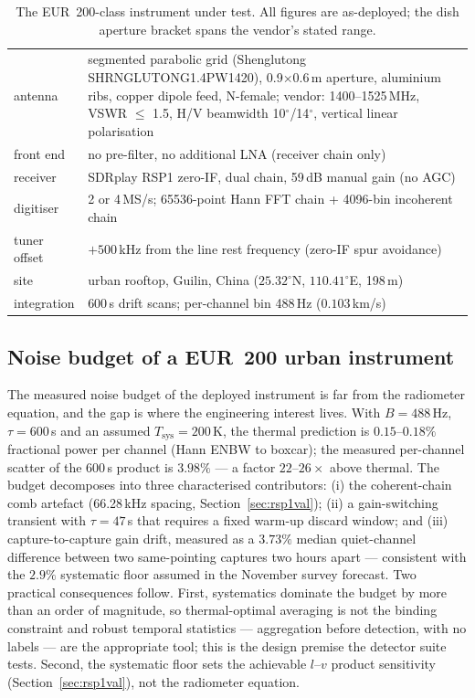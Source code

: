 \documentclass[journal]{IEEEtran}
\begin{document}
\begin{table}[!t]
\centering
\caption{The EUR~200-class instrument under test.  All figures are
as-deployed; the dish aperture bracket spans the vendor's stated range.}
\label{tab:instr}
\footnotesize
\begin{tabular}{ll}
\toprule
antenna & segmented parabolic grid (Shenglutong SHRNGLUTONG1.4PW1420), 0.9$\times$0.6\,m aperture, aluminium ribs, copper dipole feed, N-female; vendor: 1400--1525\,MHz, VSWR $\leq$ 1.5, H/V beamwidth 10$^\circ$/14$^\circ$, vertical linear polarisation \\
front end & no pre-filter, no additional LNA (receiver chain only) \\
receiver & SDRplay RSP1 zero-IF, dual chain, 59\,dB manual gain (no AGC) \\
digitiser & 2 or 4\,MS/s; 65536-point Hann FFT chain + 4096-bin incoherent chain \\
tuner offset & $+500$\,kHz from the line rest frequency (zero-IF spur avoidance) \\
site & urban rooftop, Guilin, China ($25.32^\circ$N, $110.41^\circ$E, 198\,m) \\
integration & 600\,s drift scans; per-channel bin 488\,Hz ($0.103$\,km/s) \\
\bottomrule
\end{tabular}
\end{table}

\subsection{Noise budget of a EUR~200 urban instrument}
The measured noise budget of the deployed instrument is far from the
radiometer equation, and the gap is where the engineering interest lives.
With $B{=}488$\,Hz, $\tau{=}600$\,s and an assumed
$T_{\mathrm{sys}}{=}200$\,K, the thermal prediction is
$0.15$--$0.18\%$ fractional power per channel (Hann ENBW to boxcar); the
measured per-channel scatter of the 600\,s product is $3.98\%$ --- a
factor $22$--$26\times$ above thermal.  The budget decomposes into three
characterised contributors: (i) the coherent-chain comb artefact
(66.28\,kHz spacing, Section~\ref{sec:rsp1val}); (ii) a gain-switching
transient with $\tau{=}47$\,s that requires a fixed warm-up discard
window; and (iii) capture-to-capture gain drift, measured as a $3.73\%$
median quiet-channel difference between two same-pointing captures two
hours apart --- consistent with the $2.9\%$ systematic floor assumed in
the November survey forecast.  Two practical consequences follow.
First, systematics dominate the budget by more than an order of
magnitude, so thermal-optimal averaging is not the binding constraint
and robust temporal statistics --- aggregation before detection, with no
labels --- are the appropriate tool; this is the design premise the
detector suite tests.  Second, the systematic floor sets the achievable
$l$--$v$ product sensitivity (Section~\ref{sec:rsp1val}), not the
radiometer equation.
\end{document}
